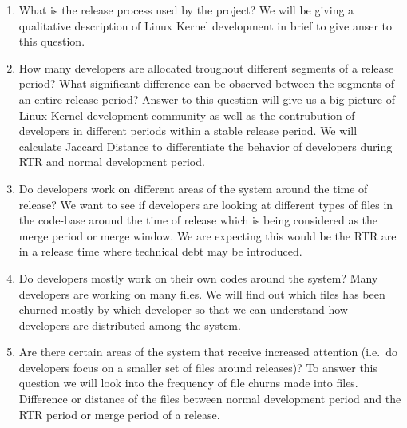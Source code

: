 \documentclass{acm_proc_article-sp}
\begin{document}
\renewcommand{\labelenumi}{Q\theenumi:}
\begin{enumerate}
\item What is the release process used by the project? \newline
We will be giving a qualitative description of Linux Kernel development in brief to give anser to this question.
\item How many developers are allocated troughout different segments of a release period? What significant difference can be observed between the segments of an entire release period? \newline
Answer to this question will give us a big picture of Linux Kernel development community as well as the contrubution of developers in different periods within a stable release period. We will calculate Jaccard Distance to differentiate the behavior of developers during RTR and normal development period.
\item Do developers work on different areas of the system around the time of release? \newline
We want to see if developers are looking at different types of files in the code-base around the time of release which is being considered as the merge period or merge window\cite{linux_kernel}. We are expecting this would be the RTR are in a release time where technical debt may be introduced.
\item Do developers mostly work on their own codes around the system?
Many developers are working on many files. We will find out which files has been churned mostly by which developer so that we can understand how developers are distributed among the system.
\item Are there certain areas of the system that receive increased attention (i.e.\ do developers focus on a smaller set of files around releases)? \newline
To answer this question we will look into the frequency of file churns made into files. Difference or distance of the files between normal development period and the RTR period or merge period of a release.
\end{enumerate}
\end{document}
